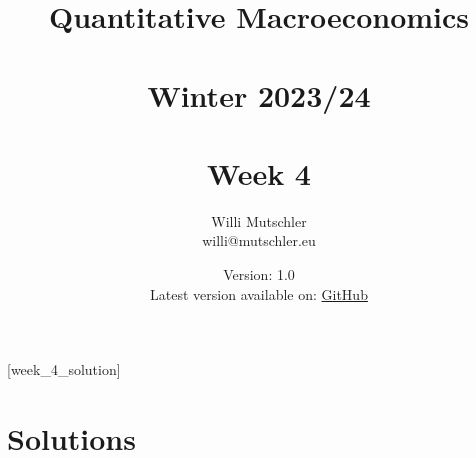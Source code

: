 
\newif\ifDisplaySolutions\DisplaySolutionstrue


\title{Quantitative Macroeconomics\\~\\Winter 2023/24\\~\\Week 4}
\author{Willi Mutschler\\willi@mutschler.eu}
\date{Version: 1.0\\Latest version available on: \href{https://github.com/wmutschl/Quantitative-Macroeconomics/releases/latest/download/week_4.pdf}{GitHub}}
\maketitle\thispagestyle{empty}

\newpage
{}[week_4_solution]
\tableofcontents\thispagestyle{empty}\newpage

\setcounter{page}{1}
\newpage
\newpage
\newpage
\printbibliography
\newpage

\ifDisplaySolutions
\newpage
\appendix
\section{Solutions}

\fi
